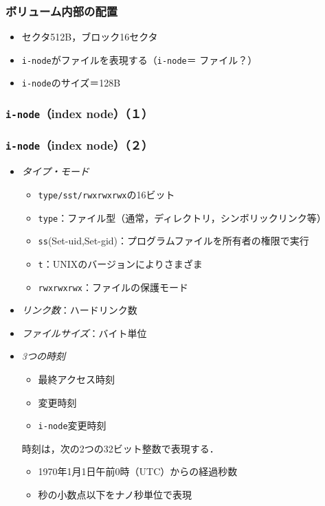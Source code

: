 \documentclass[unicode,handout]{beamer}                   %
\newcommand{\inode}{\texttt{i-node}}
\begin{document}
\begin{frame}
  \frametitle{ボリューム内部の配置}
  \begin{itemize}
  \item セクタ512B，ブロック16セクタ
  \item \inode がファイルを表現する（\inode ＝ ファイル？）
  \item \inode のサイズ＝128B
  \end{itemize}
  \vfill
\end{frame}

\begin{frame}
  \frametitle{\inode （index node）（１）}
\end{frame}

\begin{frame}
  \frametitle{\inode （index node）（２）}
  \begin{itemize}
  \item \emph{タイプ・モード}\\
    \begin{itemize}
    \item \texttt{type/sst/rwxrwxrwx}の16ビット
    \item \texttt{type}：ファイル型（通常，ディレクトリ，シンボリックリンク等）
    \item \texttt{ss}(Set-uid,Set-gid)：プログラムファイルを所有者の権限で実行
    \item \texttt{t}：UNIXのバージョンによりさまざま
    \item \texttt{rwxrwxrwx}：ファイルの保護モード
    \end{itemize}
  \item \emph{リンク数}：ハードリンク数
  \item \emph{ファイルサイズ}：バイト単位
  \item \emph{3つの時刻}\\
    \begin{itemize}
    \item 最終アクセス時刻
    \item 変更時刻
    \item \inode 変更時刻
    \end{itemize}
    時刻は，次の2つの32ビット整数で表現する．
    \begin{itemize}
    \item 1970年1月1日午前0時（UTC）からの経過秒数
    \item 秒の小数点以下をナノ秒単位で表現
    \end{itemize}
  \end{itemize}
\end{frame}
\end{document}
